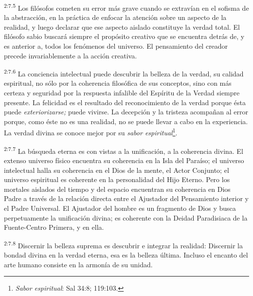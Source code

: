 \par
\textsuperscript{2:7.5} Los filósofos cometen su error más grave cuando se extravían en el sofisma de la abstracción, en la práctica de enfocar la atención sobre un aspecto de la realidad, y luego declarar que ese aspecto aislado constituye la verdad total. El filósofo sabio buscará siempre el propósito creativo que se encuentra detrás de, y es anterior a, todos los fenómenos del universo. El pensamiento del creador precede invariablemente a la acción creativa.

\par
\textsuperscript{2:7.6} La conciencia intelectual puede descubrir la belleza de la verdad, su calidad espiritual, no sólo por la coherencia filosófica de sus conceptos, sino con más certeza y seguridad por la respuesta infalible del Espíritu de la Verdad siempre presente. La felicidad es el resultado del reconocimiento de la verdad porque ésta puede \textit{exteriorizarse;} puede vivirse. La decepción y la tristeza acompañan al error porque, como éste no es una realidad, no se puede llevar a cabo en la experiencia. La verdad divina se conoce mejor por su \textit{sabor espiritual}\footnote{\textit{Sabor espiritual}: Sal 34:8; 119:103.}.

\par
\textsuperscript{2:7.7} La búsqueda eterna es con vistas a la unificación, a la coherencia divina. El extenso universo físico encuentra su coherencia en la Isla del Paraíso; el universo intelectual halla su coherencia en el Dios de la mente, el Actor Conjunto; el universo espiritual es coherente en la personalidad del Hijo Eterno. Pero los mortales aislados del tiempo y del espacio encuentran su coherencia en Dios Padre a través de la relación directa entre el Ajustador del Pensamiento interior y el Padre Universal. El Ajustador del hombre es un fragmento de Dios y busca perpetuamente la unificación divina; es coherente con la Deidad Paradisiaca de la Fuente-Centro Primera, y en ella.

\par
\textsuperscript{2:7.8} Discernir la belleza suprema es descubrir e integrar la realidad: Discernir la bondad divina en la verdad eterna, esa es la belleza última. Incluso el encanto del arte humano consiste en la armonía de su unidad.

